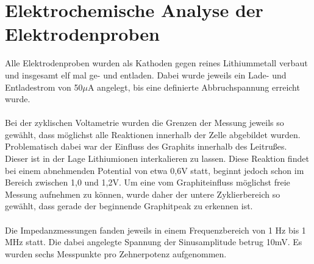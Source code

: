 \documentclass[a4paper, 11pt, headsepline,footsepline,twoside,abstract]{scrbook}
\begin{document}
\section{Elektrochemische Analyse der Elektrodenproben}
Alle Elektrodenproben wurden als Kathoden gegen reines Lithiummetall verbaut und insgesamt elf mal ge- und entladen. Dabei wurde jeweils ein Lade- und Entladestrom von 50$\mu$A angelegt, bis eine definierte Abbruchspannung erreicht wurde.
\\\\
Bei der zyklischen Voltametrie wurden die Grenzen der Messung jeweils so gewählt, dass möglichst alle Reaktionen innerhalb der Zelle abgebildet wurden. Problematisch dabei war der Einfluss des Graphits innerhalb des Leitrußes. Dieser ist in der Lage Lithiumionen interkalieren zu lassen. Diese Reaktion findet bei einem abnehmenden Potential von etwa 0,6V statt, beginnt jedoch schon im Bereich zwischen 1,0 und 1,2V. Um eine vom Graphiteinfluss möglichst freie Messung aufnehmen zu können, wurde daher der untere Zyklierbereich so gewählt, dass gerade der beginnende Graphitpeak zu erkennen ist.
\\\\ %
Die Impedanzmessungen fanden jeweils in einem Frequenzbereich von 1 Hz bis 1 MHz statt. Die dabei angelegte Spannung der Sinusamplitude betrug 10mV. Es wurden sechs Messpunkte pro Zehnerpotenz aufgenommen. %
\newpage
\end{document}
